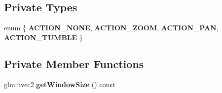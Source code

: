 \subsection*{Private Types}
\begin{DoxyCompactItemize}
\item 
\mbox{\label{classpepr3d_1_1_camera_ui_a73f6869226ee604c1fd597bb6ffbdaa4}} 
enum \{ {\bfseries A\+C\+T\+I\+O\+N\+\_\+\+N\+O\+NE}, 
{\bfseries A\+C\+T\+I\+O\+N\+\_\+\+Z\+O\+OM}, 
{\bfseries A\+C\+T\+I\+O\+N\+\_\+\+P\+AN}, 
{\bfseries A\+C\+T\+I\+O\+N\+\_\+\+T\+U\+M\+B\+LE}
 \}
\end{DoxyCompactItemize}
\subsection*{Private Member Functions}
\begin{DoxyCompactItemize}
\item 
\mbox{\label{classpepr3d_1_1_camera_ui_aef30268130c97a8717ff014e593c5781}} 
glm\+::ivec2 {\bfseries get\+Window\+Size} () const
\end{DoxyCompactItemize}
